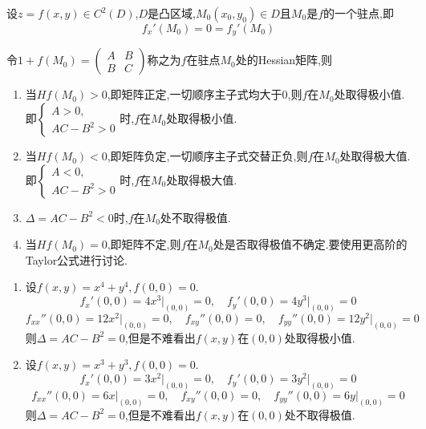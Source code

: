 \begin{theorem}
    设$z = f(x,y) \in C^2(D)$,$D$是凸区域,$M_0(x_0,y_0) \in D$且$M_0$是$f$的一个驻点,即
    $$f_x'(M_0) = 0 = f_y'(M_0)$$

    令$1+ f(M_0) = \begin{pmatrix}
        A & B\\
        B & C
    \end{pmatrix}$称之为$f$在驻点$M_0$处的Hessian矩阵,则
    \begin{enumerate}
        \item 当$Hf(M_0) > 0$,即矩阵正定,一切顺序主子式均大于0,则$f$在$M_0$处取得极小值.即$\begin{cases}
            A > 0,\\
            AC - B^2 > 0
        \end{cases}$时,$f$在$M_0$处取得极小值.
        \item 当$Hf(M_0) < 0$,即矩阵负定,一切顺序主子式交替正负,则$f$在$M_0$处取得极大值.即$\begin{cases}
            A < 0,\\
            AC - B^2 > 0
        \end{cases}$时,$f$在$M_0$处取得极大值.
        \item $\Delta = AC-B^2<0$时,$f$在$M_0$处不取得极值.
        \item 当$Hf(M_0) = 0$,即矩阵不定,则$f$在$M_0$处是否取得极值不确定.要使用更高阶的Taylor公式进行讨论.
    \end{enumerate}
\end{theorem}

\begin{example}
    \begin{enumerate}
    \item 设$f(x,y) = x^4+ y^4, f(0,0) = 0$.
    $$ f_x'(0,0) = 4x^3\bigg|_{(0,0)} = 0,\quad f_y'(0,0) = 4y^3\bigg|_{(0,0)} = 0$$
    $$ f_{xx}''(0,0) = 12x^2\bigg|_{(0,0)} = 0,\quad f_{xy}''(0,0) = 0,\quad f_{yy}''(0,0) = 12y^2\bigg|_{(0,0)} = 0$$
    则$\Delta = AC - B^2 = 0$,但是不难看出$f(x,y)$在$(0,0)$处取得极小值.
    \item 设$f(x,y) = x^3 + y^3, f(0,0) = 0$.
    $$ f_x'(0,0) = 3x^2\bigg|_{(0,0)} = 0,\quad f_y'(0,0) = 3y^2\bigg|_{(0,0)} = 0$$
    $$ f_{xx}''(0,0) = 6x\bigg|_{(0,0)} = 0,\quad f_{xy}''(0,0) = 0,\quad f_{yy}''(0,0) = 6y\bigg|_{(0,0)} = 0$$
    则$\Delta = AC - B^2 = 0$,但是不难看出$f(x,y)$在$(0,0)$处不取得极值.
    \end{enumerate}
\end{example}

